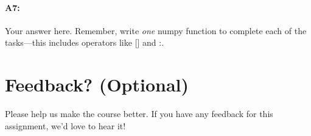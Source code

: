 \pagebreak
\paragraph{A7:} Your answer here. Remember, write \emph{one} numpy function to complete each of the tasks---this includes operators like [] and :.



\pagebreak
\section*{Feedback? (Optional)}
Please help us make the course better. If you have any feedback for this assignment, we'd love to hear it!


